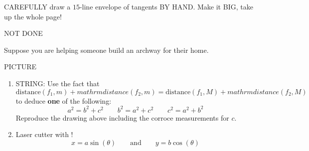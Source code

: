 \documentclass[noauthor,nooutcomes,hints,handout]{ximera}
\begin{document}
\mynewpage






\begin{question}
  CAREFULLY draw a $15$-line envelope of tangents BY HAND. Make it
  BIG, take up the whole page!
  \begin{freeResponse}
    NOT DONE
  \end{freeResponse}
\end{question}
\mynewpage





\begin{question}
  Suppose you are helping someone build an archway for their home.

  \begin{center}
    PICTURE
  \end{center}
  \begin{enumerate}
  \item STRING:
    Use the fact that 
    \[
    \mathrm{distance}(f_1,m) + mathrm{distance}(f_2,m) =
    \mathrm{distance}(f_1,M) + mathrm{distance}(f_2,M)
    \]
    to deduce \textbf{one} of the following:
    \[
    a^2 = b^2 + c^2 \qquad b^2 = a^2+c^2 \qquad c^2 = a^2 + b^2
    \]
    Reproduce the drawing above including the corroce measurements for $c$.


  \item Laser cutter with \snap!
    \[
    x = a\sin(\theta) \qquad\text{and} \qquad y= b\cos(\theta)
    \]

  \end{enumerate}

\end{question}
\mynewpage
\end{document}

